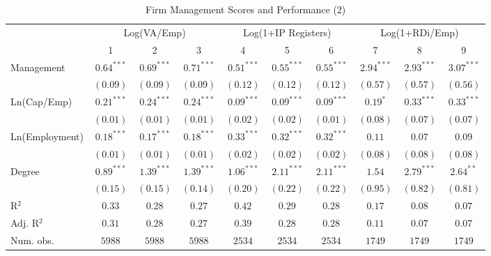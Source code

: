 \documentclass{article}
\begin{document}
\begin{table}
\caption{Firm Management Scores and Performance (2)}
\begin{center}
\begin{small}
\begin{tabular}{l c c c c c c c c c}
\hline
 & \multicolumn{3}{c}{Log(VA/Emp)} & \multicolumn{3}{c}{Log(1+IP Registers)} & \multicolumn{3}{c}{Log(1+RDi/Emp)} \\
\cline{2-4} \cline{5-7} \cline{8-10}
 & 1 & 2 & 3 & 4 & 5 & 6 & 7 & 8 & 9 \\
\hline
Management     & $0.64^{***}$ & $0.69^{***}$ & $0.71^{***}$ & $0.51^{***}$ & $0.55^{***}$ & $0.55^{***}$ & $2.94^{***}$ & $2.93^{***}$ & $3.07^{***}$ \\
               & $(0.09)$     & $(0.09)$     & $(0.09)$     & $(0.12)$     & $(0.12)$     & $(0.12)$     & $(0.57)$     & $(0.57)$     & $(0.56)$     \\
Ln(Cap/Emp)    & $0.21^{***}$ & $0.24^{***}$ & $0.24^{***}$ & $0.09^{***}$ & $0.09^{***}$ & $0.09^{***}$ & $0.19^{*}$   & $0.33^{***}$ & $0.33^{***}$ \\
               & $(0.01)$     & $(0.01)$     & $(0.01)$     & $(0.02)$     & $(0.02)$     & $(0.01)$     & $(0.08)$     & $(0.07)$     & $(0.07)$     \\
Ln(Employment) & $0.18^{***}$ & $0.17^{***}$ & $0.18^{***}$ & $0.33^{***}$ & $0.32^{***}$ & $0.32^{***}$ & $0.11$       & $0.07$       & $0.09$       \\
               & $(0.01)$     & $(0.01)$     & $(0.01)$     & $(0.02)$     & $(0.02)$     & $(0.02)$     & $(0.08)$     & $(0.08)$     & $(0.08)$     \\
Degree         & $0.89^{***}$ & $1.39^{***}$ & $1.39^{***}$ & $1.06^{***}$ & $2.11^{***}$ & $2.11^{***}$ & $1.54$       & $2.79^{***}$ & $2.64^{**}$  \\
               & $(0.15)$     & $(0.15)$     & $(0.14)$     & $(0.20)$     & $(0.22)$     & $(0.22)$     & $(0.95)$     & $(0.82)$     & $(0.81)$     \\
\hline
R$^2$          & $0.33$       & $0.28$       & $0.27$       & $0.42$       & $0.29$       & $0.28$       & $0.17$       & $0.08$       & $0.07$       \\
Adj. R$^2$     & $0.31$       & $0.28$       & $0.27$       & $0.39$       & $0.28$       & $0.28$       & $0.11$       & $0.07$       & $0.07$       \\
Num. obs.      & $5988$       & $5988$       & $5988$       & $2534$       & $2534$       & $2534$       & $1749$       & $1749$       & $1749$       \\

\end{tabular}
\end{small}
\end{center}
\end{table}
\end{document}
